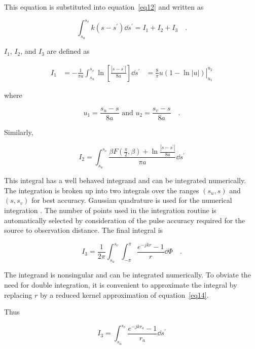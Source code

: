 \documentclass[12pt]{article}
\begin{document}
This equation is substituted into equation~\eqref{eq12} and written as

\begin{equation}
\int_{s_u}^{s_v} k(s-s^\prime)\dd{s^\prime} = I_1 + I_2 + I_3
\quad.
\label{eq20}
\end{equation}

$I_1$, $I_2$, and $I_3$ are defined as

\begin{equation}
\begin{aligned}
I_1 & = -\frac{1}{\pi a}\int_{s_u}^{s_v}
        \ln\left[\frac{|s-s^\prime|}{8a}\right] \dd{s^\prime}
    & = \left.\frac{8}{\pi} u(1-\ln|u|)\right|_{u_1}^{u_2}
\end{aligned}
\label{eq21}
\end{equation}

where

\[ u_1 = \frac{s_u - s}{8a} \mbox{ and } u_2 = \frac{s_v - s}{8a}
\quad.
\]

\noindent Similarly,

\begin{equation}
I_2 = \int_{s_u}^{s_v}
\frac{\beta F\left(\frac{\pi}{2}, \beta\right)
+ \ln\frac{|s-s^\prime|}{8a}}{\pi a}\dd{s^\prime}
\label{eq22}
\end{equation}

This integral has a well behaved integrand and can be integrated
numerically. The integration is broken up into two integrals over the
ranges $(s_u, s)$ and $(s, s_v)$ for best accuracy. Gaussian quadrature
is used for the numerical integration \cite{r7}. The number
of points used in the integration routine is automatically selected by
consideration of the pulse accuracy required for the source to
observation distance. The final integral is

\begin{equation}
I_3 = \frac{1}{2\pi}\int_{s_u}^{s_v}\int_{-\pi}^\pi\frac{e^{-jkr}-1}{r}\dd{\Phi}
\quad.
\label{eq23}
\end{equation}

The integrand is nonsingular and can be integrated numerically. To
obviate the need for double integration, it is convenient to approximate
the integral by replacing $r$ by a reduced kernel approximation of
equation~\eqref{eq14}.

\noindent Thus

\begin{equation}
I_3 = \int_{s_u}^{s_v}\frac{e^{-jkr_a}-1}{r_a}\dd{s^\prime}
\label{eq24}
\end{equation}
\end{document}
